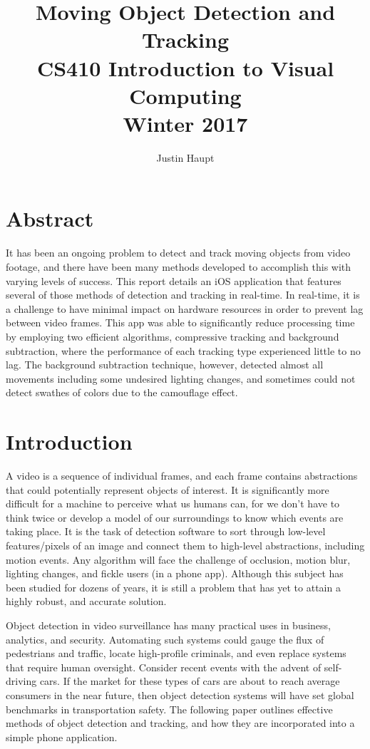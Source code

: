 \documentclass[11pt,letterpaper]{article}
\author{Justin Haupt}
\title{Moving Object Detection and Tracking\\CS410 Introduction to Visual Computing\\ Winter 2017}
\date{}
\begin{document}
	\maketitle

    \newpage
	\section*{Abstract}
	It has been an ongoing problem to detect and track moving objects from video footage, and there have been many methods developed to accomplish this with varying levels of success. This report details an iOS application that features several of those methods of detection and tracking in real-time. In real-time, it is a challenge to have minimal impact on hardware resources in order to prevent lag between video frames. This app was able to significantly reduce processing time by employing two efficient algorithms, compressive tracking and background subtraction, where the performance of each tracking type experienced little to no lag. The background subtraction technique, however, detected almost all movements including some undesired lighting changes, and sometimes could not detect swathes of colors due to the camouflage effect.\\
	
	\section{Introduction}
	A video is a sequence of individual frames, and each frame contains abstractions that could potentially represent objects of interest. It is significantly more difficult for a machine to perceive what us humans can, for we don't have to think twice or develop a model of our surroundings to know which events are taking place. It is the task of detection software to sort through low-level features/pixels of an image and connect them to high-level abstractions, including motion events. Any algorithm will face the challenge of occlusion, motion blur, lighting changes, and fickle users (in a phone app). Although this subject has been studied for dozens of years, it is still a problem that has yet to attain a highly robust, and accurate solution.
	
	Object detection in video surveillance has many practical uses in business, analytics, and security. Automating such systems could gauge the flux of pedestrians and traffic, locate high-profile criminals, and even replace systems that require human oversight. Consider recent events with the advent of self-driving cars. If the market for these types of cars are about to reach average consumers in the near future, then object detection systems will have set global benchmarks in transportation safety. The following paper outlines effective methods of object detection and tracking, and how they are incorporated into a simple phone application.\\
	
\end{document}
